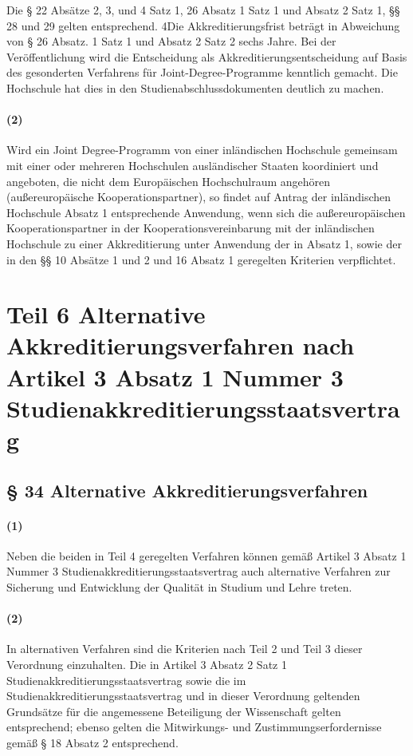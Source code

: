 \documentclass[a4paper]{scrartcl}
\begin{document}
Die § 22 Absätze 2, 3, und 4 Satz 1, 26 Absatz 1 Satz 1 und Absatz 2 Satz 1, §§ 28 und 29 gelten entsprechend. 4Die Akkreditierungsfrist beträgt in Abweichung von § 26 Absatz. 1 Satz 1 und Absatz 2 Satz 2 sechs Jahre. Bei der Veröffentlichung wird die Entscheidung als Akkreditierungsentscheidung auf Basis des gesonderten Verfahrens für Joint-Degree-Programme kenntlich gemacht. Die Hochschule hat dies in den Studienabschlussdokumenten deutlich zu machen.
\paragraph{(2)} Wird ein Joint Degree-Programm von einer inländischen Hochschule gemeinsam mit einer oder mehreren Hochschulen ausländischer Staaten koordiniert und angeboten, die nicht dem Europäischen Hochschulraum angehören (außereuropäische Kooperationspartner), so findet auf Antrag der inländischen Hochschule Absatz 1 entsprechende Anwendung, wenn sich die außereuropäischen Kooperationspartner in der Kooperationsvereinbarung mit der inländischen Hochschule zu einer Akkreditierung unter Anwendung der in Absatz 1, sowie der in den §§ 10 Absätze 1 und 2 und 16 Absatz 1 geregelten Kriterien verpflichtet.
\section{Teil 6 Alternative Akkreditierungsverfahren nach Artikel 3 Absatz 1 Nummer 3 Studienakkreditierungsstaatsvertrag}
\subsection{§ 34 Alternative Akkreditierungsverfahren}
\paragraph{(1)} Neben die beiden in Teil 4 geregelten Verfahren können gemäß Artikel 3 Absatz 1 Nummer 3 Studienakkreditierungsstaatsvertrag auch alternative Verfahren zur Sicherung und Entwicklung der Qualität in Studium und Lehre treten.
\paragraph{(2)} In alternativen Verfahren sind die Kriterien nach Teil 2 und Teil 3 dieser Verordnung einzuhalten. Die in Artikel 3 Absatz 2 Satz 1 Studienakkreditierungsstaatsvertrag sowie die im Studienakkreditierungsstaatsvertrag und in dieser Verordnung geltenden Grundsätze für die angemessene Beteiligung der Wissenschaft gelten entsprechend; ebenso gelten die Mitwirkungs- und Zustimmungserfordernisse gemäß § 18 Absatz 2 entsprechend.
\end{document}
